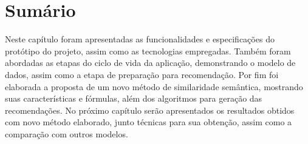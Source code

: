 \section{Sumário}

Neste capítulo foram apresentadas as funcionalidades e especificações do protótipo do projeto, assim como as tecnologias empregadas. Também foram abordadas as etapas do ciclo de vida da aplicação, demonstrando o modelo de dados, assim como a etapa de preparação para recomendação. Por fim foi elaborada a proposta de um novo método de similaridade semântica, mostrando suas características e fórmulas, além dos algoritmos para geração das recomendações. No próximo capítulo serão apresentados os resultados obtidos com novo método elaborado, junto técnicas para sua obtenção, assim como a comparação com outros modelos.